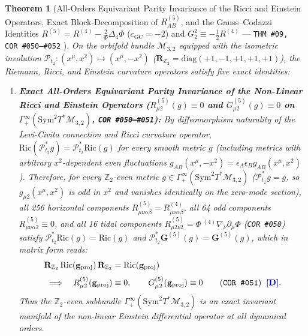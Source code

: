 \documentclass[11pt,a4paper]{article}
\newcommand{\catD}{\text{\textbf{\textcolor{blue!75!black}{[D]}}}}
\theoremstyle{definition}
\theoremstyle{plain}
\newtheorem{theorem}[axiom]{Theorem}
\theoremstyle{remark}
\begin{document}
\begin{theorem}[All-Orders Equivariant Parity Invariance of the Ricci and Einstein Operators, Exact Block-Decomposition of $R_{AB}^{(5)}$, and the Gauss--Codazzi Identities $R^{(5)} = R^{(4)} - \frac{2}{\Phi}\Delta_4\Phi$ ($c_{\mathrm{GC}}=-2$) and $G^2_2 \equiv -\frac{1}{2}R^{(4)}$ --- \texttt{THM~\#09, COR~\#050--\#052} \catD]\label{thm:c2_total_bending_reduction}
On the orbifold bundle $\mathcal{M}_{3,2}$ equipped with the isometric involution $\mathcal{P}_{t_2}: (x^\mu, x^2) \mapsto (x^\mu, -x^2)$ ($\mathbf{R}_{\mathbb{Z}_2} = \mathrm{diag}(+1,-1,+1,+1,+1)$), the Riemann, Ricci, and Einstein curvature operators satisfy five exact identities:
\begin{enumerate}[label=(\roman*)]
  \item \textbf{Exact All-Orders Equivariant Parity Invariance of the Non-Linear Ricci and Einstein Operators ($R_{\mu 2}^{(5)}(g) \equiv 0$ and $G_{\mu 2}^{(5)}(g) \equiv 0$ on $\Gamma^\infty_+(\mathrm{Sym}^2 T^*\mathcal{M}_{3,2})$, \texttt{COR~\#050--\#051}):}
  By diffeomorphism naturality of the Levi-Civita connection and Ricci curvature operator, $\mathrm{Ric}(\mathcal{P}_{t_2}^* g) = \mathcal{P}_{t_2}^*\mathrm{Ric}(g)$ for every smooth metric $g$ (including metrics with arbitrary $x^2$-dependent even fluctuations $g_{AB}(x^\mu, -x^2) = \epsilon_A\epsilon_B g_{AB}(x^\mu, x^2)$). Therefore, for every $\mathbb{Z}_2$-even metric $g \in \Gamma^\infty_+(\mathrm{Sym}^2 T^*\mathcal{M}_{3,2})$ ($\mathcal{P}_{t_2}^* g = g$, so $g_{\mu 2}(x^\mu, x^2)$ is odd in $x^2$ and vanishes identically on the zero-mode section), all 256 horizontal components $R^{(5)}_{\mu\nu\alpha\beta} = R^{(4)}_{\mu\nu\alpha\beta}$, all 64 odd components $R^{(5)}_{\mu\nu\alpha 2} \equiv 0$, and all 16 tidal components $R^{(5)}_{\mu 2\nu 2} = \Phi\,{}^{(4)}\nabla_\nu\partial_\mu\Phi$ (\texttt{COR~\#050}) satisfy $\mathcal{P}_{t_2}^*\mathrm{Ric}(g) = \mathrm{Ric}(g)$ and $\mathcal{P}_{t_2}^*\mathbf{G}^{(5)}(g) = \mathbf{G}^{(5)}(g)$, which in matrix form reads:
  \begin{align}
  \mathbf{R}_{\mathbb{Z}_2}\,\mathrm{Ric}(\mathbf{g}_{\mathrm{proj}})\,\mathbf{R}_{\mathbb{Z}_2} &= \mathrm{Ric}(\mathbf{g}_{\mathrm{proj}}) \nonumber \\[3pt]
  \Longrightarrow \quad R_{\mu 2}^{(5)}(\mathbf{g}_{\mathrm{proj}}) &\equiv 0, \qquad
  G_{\mu 2}^{(5)}(\mathbf{g}_{\mathrm{proj}}) \equiv 0 \qquad \textnormal{(\texttt{COR~\#051})} \;\;\catD. \label{eq:c2_equivariant_ricci_parity}
  \end{align}
  Thus the $\mathbb{Z}_2$-even subbundle $\Gamma^\infty_+(\mathrm{Sym}^2 T^*\mathcal{M}_{3,2})$ is an exact invariant manifold of the non-linear Einstein differential operator at all dynamical orders.

\end{enumerate}
\end{theorem}
\end{document}

